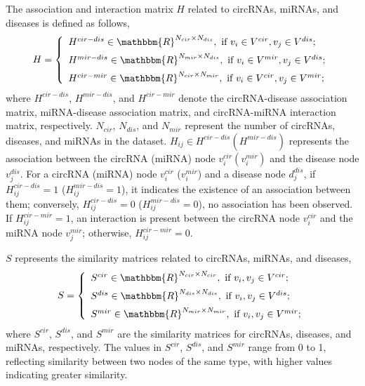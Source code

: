 \documentclass{bioinfo}
\begin{document}
\begin{methods}
The association and interaction matrix $H$ related to circRNAs, miRNAs, and diseases is defined as follows,
\begin{equation}
H = \left\{ \begin{array}{l}
{H^{cir-dis}} \in {\mathbbm{R}^{N_{cir}\times N_{dis}}}, \text{ if } {v_i} \in {V^{cir}}, {v_j} \in {V^{dis}};\\[5pt]
{H^{mir-dis}} \in {\mathbbm{R}^{N_{mir}\times N_{dis}}}, \text{ if } {v_i} \in {V^{mir}}, {v_j} \in {V^{dis}};\\[5pt]
{H^{cir-mir}} \in {\mathbbm{R}^{N_{cir}\times N_{mir}}}, \text{ if } {v_i} \in {V^{cir}}, {v_j} \in {V^{mir}};\\
\end{array} \right.
\end{equation}
where $H^{cir-dis}$, $H^{mir-dis}$, and $H^{cir-mir}$ denote the circRNA-disease association matrix, miRNA-disease association matrix, and circRNA-miRNA interaction matrix, respectively. $N_{cir}$, $N_{dis}$, and $N_{mir}$ represent the number of circRNAs, diseases, and miRNAs in the dataset. 
$H_{ij} \in H^{cir-dis} (H^{mir-dis})$ represents the association between the circRNA (miRNA) node $v_i^{cir}(v_i^{mir})$ and the disease node $v_j^{dis}$. For a circRNA (miRNA) node $v_i^{cir}$ ($v_i^{mir}$) and a disease node $d_j^{dis}$, if $H_{ij}^{cir-dis}=1$ ($H_{ij}^{mir-dis}=1$), it indicates the existence of an association between them; conversely, $H_{ij}^{cir-dis}=0$ ($H_{ij}^{mir-dis}=0$), no association has been observed. If $H_{ij}^{cir-mir}=1$, an interaction is present between the circRNA node $v_i^{cir}$ and the miRNA node $v_j^{mir}$; otherwise, $H_{ij}^{cir-mir}=0$.

$S$ represents the similarity matrices related to circRNAs, miRNAs, and diseases,
\begin{equation}
S = \left\{ \begin{array}{l}
{S^{cir}} \in {\mathbbm{R}^{N_{cir}\times N_{cir}}}, \text{ if } {v_i},{v_j} \in {V^{cir}};\\[5pt]
{S^{dis}} \in {\mathbbm{R}^{N_{dis}\times N_{dis}}}, \text{ if } {v_i},{v_j} \in {V^{dis}};\\[5pt]
{S^{mir}} \in {\mathbbm{R}^{N_{mir}\times N_{mir}}}, \text{ if } {v_i},{v_j} \in {V^{mir}};\\
\end{array} \right.
\end{equation}
where $S^{cir}$, $S^{dis}$, and $S^{mir}$ are the similarity matrices for circRNAs, diseases, and miRNAs, respectively. The values in $S^{cir}$, $S^{dis}$, and $S^{mir}$ range from 0 to 1, reflecting similarity between two nodes of the same type, with higher values indicating greater similarity.


\end{methods}
\end{document}
